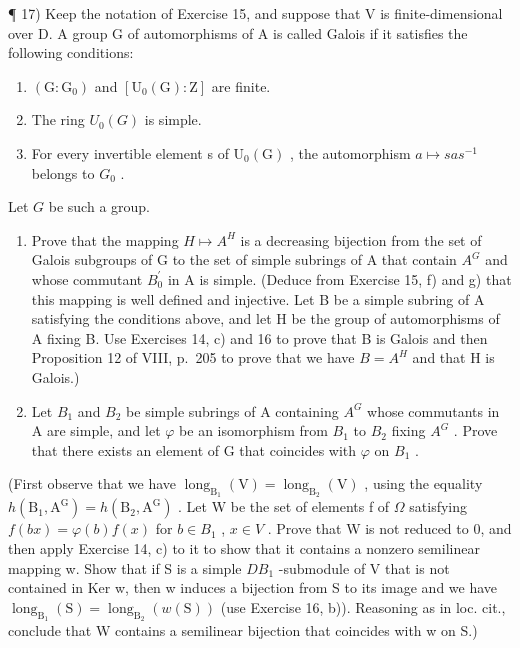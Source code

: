 ¶ 17) Keep the notation of Exercise 15, and suppose that V is finite-dimensional over D. A group G of automorphisms of A is called Galois if it satisfies the following conditions:

\begin{enumerate}
\def\labelenumi{(\roman{enumi})}
\item
  \((\mathrm{G}:\mathrm{G}_{0})\) and \([\mathrm{U}_{0}(\mathrm{G}):\mathrm{Z}]\) are finite.
\item
  The ring \(U_{0}(G)\) is simple.
\item
  For every invertible element s of \(\mathrm{U}_{0}(\mathrm{G})\) , the automorphism \(a \mapsto sas^{-1}\) belongs to \(G_{0}\) .
\end{enumerate}

Let \(G\) be such a group.

\begin{enumerate}
\def\labelenumi{\alph{enumi})}
\item
  Prove that the mapping \(H \mapsto A^{H}\) is a decreasing bijection from the set of Galois subgroups of G to the set of simple subrings of A that contain \(A^{G}\) and whose commutant \(B_{0}^{\prime}\) in A is simple. (Deduce from Exercise 15, f) and g) that this mapping is well defined and injective. Let B be a simple subring of A satisfying the conditions above, and let H be the group of automorphisms of A fixing B. Use Exercises 14, c) and 16 to prove that B is Galois and then Proposition 12 of VIII, p.~205 to prove that we have \(B = A^{H}\) and that H is Galois.)
\item
  Let \(B_{1}\) and \(B_{2}\) be simple subrings of A containing \(A^{G}\) whose commutants in A are simple, and let \(\varphi\) be an isomorphism from \(B_{1}\) to \(B_{2}\) fixing \(A^{G}\) . Prove that there exists an element of G that coincides with \(\varphi\) on \(B_{1}\) .
\end{enumerate}

(First observe that we have \(\operatorname{long}_{\mathrm{B}_{1}}(\mathrm{V}) = \operatorname{long}_{\mathrm{B}_{2}}(\mathrm{V})\) , using the equality \(h(\mathrm{B}_{1}, \mathrm{A}^{\mathrm{G}}) = h(\mathrm{B}_{2}, \mathrm{A}^{\mathrm{G}})\) . Let W be the set of elements f of \(\Omega\) satisfying \(f(bx) = \varphi(b)f(x)\) for \(b \in B_{1}\) , \(x \in V\) . Prove that W is not reduced to 0, and then apply Exercise 14, c) to it to show that it contains a nonzero semilinear mapping w. Show that if S is a simple \(DB_{1}\) -submodule of V that is not contained in Ker w, then w induces a bijection from S to its image and we have \(\operatorname{long}_{\mathrm{B}_{1}}(\mathrm{S}) = \operatorname{long}_{\mathrm{B}_{2}}(w(\mathrm{S}))\) (use Exercise 16, b)). Reasoning as in loc. cit., conclude that W contains a semilinear bijection that coincides with w on S.)

